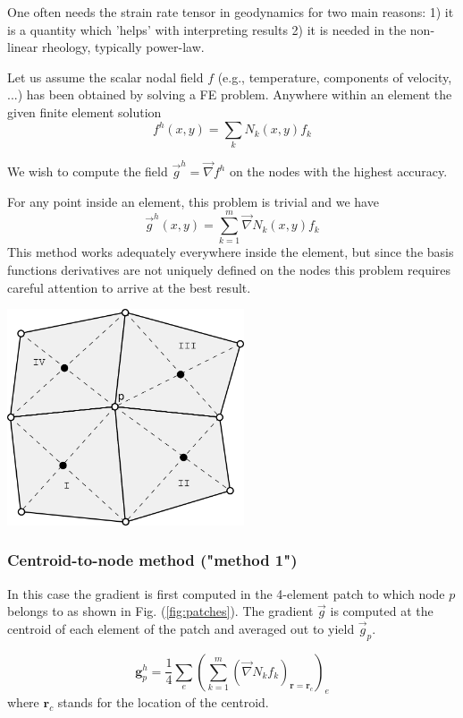 
One often needs the strain rate tensor in geodynamics for two main reasons:
1) it is a quantity which 'helps' with interpreting results
2) it is needed in the non-linear rheology, typically power-law.

Let us assume the scalar nodal field $f$ (e.g., temperature, 
components of velocity, ...) has been obtained by solving a FE problem.
Anywhere within an element 
the given finite element solution 
\[
f^h(x,y)=\sum_k N_k(x,y) f_k
\]
 
We wish to compute the field $\vec g^h = \vec \nabla f^h$ on the nodes 
with the highest accuracy. 

For any point inside an element, this problem is trivial and we have 
\begin{equation}
\vec g^h(x,y) = \sum_{k=1}^m \vec\nabla N_k (x,y) f_k \label{eq:derr1}
\end{equation}
This method works adequately everywhere inside the element, but 
since the basis functions derivatives
are not uniquely defined on the nodes 
this problem requires careful attention
to arrive at the best result.

\begin{center}
\includegraphics[width=7cm]{images/patch/patch3}
\end{center}

\subsubsection{Centroid-to-node method ("method 1")}
In this case the gradient is first computed in the 4-element patch 
to which node $p$ belongs to as shown in Fig. (\ref{fig:patches}).
The gradient $\vec g$ is computed at the centroid of each element of the 
patch and averaged out to yield $\vec g_p$.

\[
\bm g_p^h = \frac{1}{4} \sum_{e} \left( \sum_{k=1}^m  (\vec\nabla N_k f_k)_{\bm r=\bm r_c} \right)_e
\]
where $\bm r_c$ stands for the location of the centroid. 

